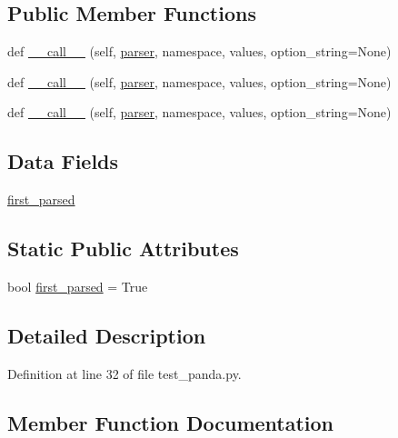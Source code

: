 \subsection*{Public Member Functions}
\begin{DoxyCompactItemize}
\item 
def \hyperlink{classtest__panda_1_1StoreOrUpdateMin_af8b0342a587abe4ea380c333ebe3dc73}{\+\_\+\+\_\+call\+\_\+\+\_\+} (self, \hyperlink{namespacetest__panda_a9be83b1904aaf2557970fcb731bd6d2e}{parser}, namespace, values, option\+\_\+string=None)
\item 
def \hyperlink{classtest__panda_1_1StoreOrUpdateMin_af8b0342a587abe4ea380c333ebe3dc73}{\+\_\+\+\_\+call\+\_\+\+\_\+} (self, \hyperlink{namespacetest__panda_a9be83b1904aaf2557970fcb731bd6d2e}{parser}, namespace, values, option\+\_\+string=None)
\item 
def \hyperlink{classtest__panda_1_1StoreOrUpdateMin_af8b0342a587abe4ea380c333ebe3dc73}{\+\_\+\+\_\+call\+\_\+\+\_\+} (self, \hyperlink{namespacetest__panda_a9be83b1904aaf2557970fcb731bd6d2e}{parser}, namespace, values, option\+\_\+string=None)
\end{DoxyCompactItemize}
\subsection*{Data Fields}
\begin{DoxyCompactItemize}
\item 
\hyperlink{classtest__panda_1_1StoreOrUpdateMin_a97571fb437e445b13cd2bbd9eaf3a664}{first\+\_\+parsed}
\end{DoxyCompactItemize}
\subsection*{Static Public Attributes}
\begin{DoxyCompactItemize}
\item 
bool \hyperlink{classtest__panda_1_1StoreOrUpdateMin_a537be5d9b06664128c2a1289200607c0}{first\+\_\+parsed} = True
\end{DoxyCompactItemize}


\subsection{Detailed Description}


Definition at line 32 of file test\+\_\+panda.\+py.



\subsection{Member Function Documentation}
\mbox{\label{classtest__panda_1_1StoreOrUpdateMin_af8b0342a587abe4ea380c333ebe3dc73}} 
